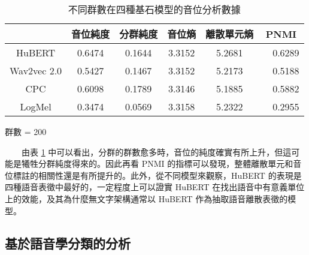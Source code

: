 \begin{table}[!htbp]
            \vspace{0.5cm}        

            \begin{subtable}[t]{\textwidth}
                \centering
                \begin{tabular}{|c|c|c|c|c|c|} \hline 
                                & 音位純度 & 分群純度 & 音位熵 & 離散單元熵 &    PNMI \\ \hline 
                    HuBERT      &   0.6474 &   0.1644 & 3.3152 &     5.2681 &　0.6289 \\ \hline    %
                    Wav2vec 2.0 &   0.5427 &   0.1467 & 3.3152 &     5.2173 &　0.5188 \\ \hline    %
                    CPC         &   0.6098 &   0.1789 & 3.3146 &     5.1885 &　0.5882 \\ \hline    %
                    LogMel      &   0.3474 &   0.0569 & 3.3158 &     5.2322 &　0.2955 \\ \hline    %
                \end{tabular}
                \caption{群數 = 200}
                \label{tab:ch3-clu200}
            \end{subtable}        

            \caption{不同群數在四種基石模型的音位分析數據}
            \label{tab:single-cluster-results}
        \end{table}

　　由表 \ref{tab:single-cluster-results} 中可以看出，分群的群數愈多時，音位的純度確實有所上升，但這可能是犧牲分群純度得來的。因此再看 PNMI 的指標可以發現，整體離散單元和音位標註的相關性還是有所提升的。此外，從不同模型來觀察，HuBERT 的表現是四種語音表徵中最好的，一定程度上可以證實 HuBERT 在找出語音中有意義單位上的效能，及其為什麼無文字架構通常以 HuBERT 作為抽取語音離散表徵的模型。

\subsection{基於語音學分類的分析}

